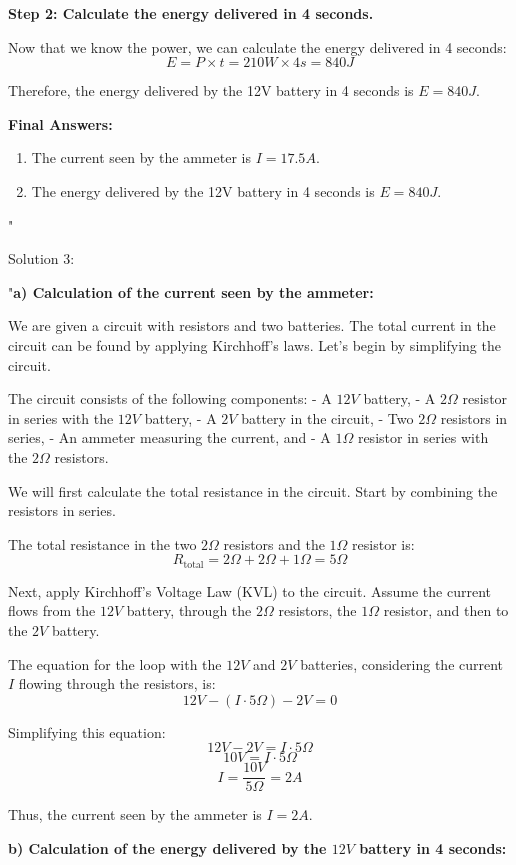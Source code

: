 \textbf{Step 2: Calculate the energy delivered in 4 seconds.}

Now that we know the power, we can calculate the energy delivered in 4 seconds:
\[
E = P \times t = 210W \times 4s = 840J
\]

Therefore, the energy delivered by the 12V battery in 4 seconds is \(E = 840J\).

\textbf{Final Answers:}
\begin{enumerate}
    \item The current seen by the ammeter is \(I = 17.5A\).
    \item The energy delivered by the 12V battery in 4 seconds is \(E = 840J\).
\end{enumerate}"

Solution 3:

"\textbf{a) Calculation of the current seen by the ammeter:}

We are given a circuit with resistors and two batteries. The total current in the circuit can be found by applying Kirchhoff’s laws. Let’s begin by simplifying the circuit.

The circuit consists of the following components:
- A $12V$ battery,
- A $2\Omega$ resistor in series with the $12V$ battery,
- A $2V$ battery in the circuit,
- Two $2\Omega$ resistors in series,
- An ammeter measuring the current, and
- A $1\Omega$ resistor in series with the $2\Omega$ resistors.

We will first calculate the total resistance in the circuit. Start by combining the resistors in series.

The total resistance in the two $2\Omega$ resistors and the $1\Omega$ resistor is:
\[
R_{\text{total}} = 2\Omega + 2\Omega + 1\Omega = 5\Omega
\]

Next, apply Kirchhoff’s Voltage Law (KVL) to the circuit. Assume the current flows from the $12V$ battery, through the $2\Omega$ resistors, the $1\Omega$ resistor, and then to the $2V$ battery. 

The equation for the loop with the $12V$ and $2V$ batteries, considering the current $I$ flowing through the resistors, is:
\[
12V - (I \cdot 5\Omega) - 2V = 0
\]

Simplifying this equation:
\[
12V - 2V = I \cdot 5\Omega
\]
\[
10V = I \cdot 5\Omega
\]
\[
I = \frac{10V}{5\Omega} = 2A
\]

Thus, the current seen by the ammeter is $I = 2A$.

\textbf{b) Calculation of the energy delivered by the $12V$ battery in 4 seconds:}

